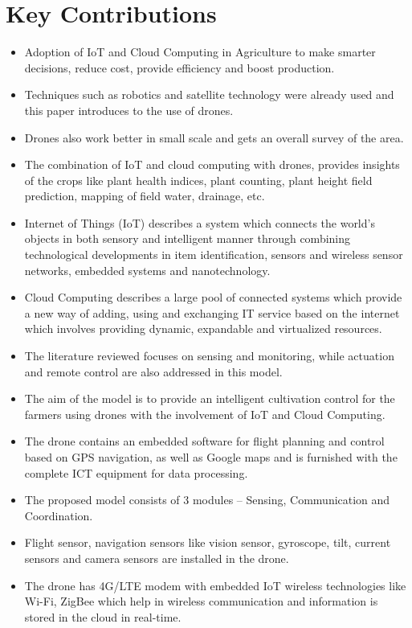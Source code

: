 \documentclass{article}
\begin{document}
\section{Key Contributions}
\begin{itemize}
    \item Adoption of IoT and Cloud Computing in Agriculture to make smarter decisions, reduce cost, provide efficiency and boost production.
    \item Techniques such as robotics and satellite technology were already used and this paper introduces to the use of drones.
    \item Drones also work better in small scale and gets an overall survey of the area.
    \item The combination of IoT and cloud computing with drones, provides insights of the crops like plant health indices, plant counting, plant height field prediction, mapping of field water, drainage, etc.
    \item Internet of Things (IoT) describes a system which connects the world’s objects in both sensory and intelligent manner through combining technological developments in item identification, sensors and wireless sensor networks, embedded systems and nanotechnology.
    \item Cloud Computing describes a large pool of connected systems which provide a new way of adding, using and exchanging IT service based on the internet which involves providing dynamic, expandable and virtualized resources.
    \item The literature reviewed focuses on sensing and monitoring, while actuation and remote control are also addressed in this model.
    \item The aim of the model is to provide an intelligent cultivation control for the farmers using drones with the involvement of IoT and Cloud Computing.
    \item The drone contains an embedded software for flight planning and control based on GPS navigation, as well as Google maps and is furnished with the complete ICT equipment for data processing.
    \item The proposed model consists of 3 modules – Sensing, Communication and Coordination.
    \item Flight sensor, navigation sensors like vision sensor, gyroscope, tilt, current sensors and camera sensors are installed in the drone.
    \item The drone has 4G/LTE modem with embedded IoT wireless technologies like Wi-Fi, ZigBee which help in wireless communication and information is stored in the cloud in real-time.

\end{itemize}
\end{document}
